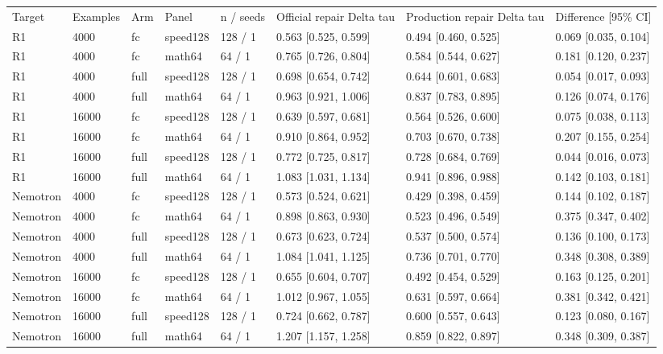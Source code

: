\begin{tabular}{llllllll}
Target & Examples & Arm & Panel & n / seeds & Official repair Delta tau & Production repair Delta tau & Difference [95\% CI] \\
R1 & 4000 & fc & speed128 & 128 / 1 & 0.563 [0.525, 0.599] & 0.494 [0.460, 0.525] & 0.069 [0.035, 0.104] \\
R1 & 4000 & fc & math64 & 64 / 1 & 0.765 [0.726, 0.804] & 0.584 [0.544, 0.627] & 0.181 [0.120, 0.237] \\
R1 & 4000 & full & speed128 & 128 / 1 & 0.698 [0.654, 0.742] & 0.644 [0.601, 0.683] & 0.054 [0.017, 0.093] \\
R1 & 4000 & full & math64 & 64 / 1 & 0.963 [0.921, 1.006] & 0.837 [0.783, 0.895] & 0.126 [0.074, 0.176] \\
R1 & 16000 & fc & speed128 & 128 / 1 & 0.639 [0.597, 0.681] & 0.564 [0.526, 0.600] & 0.075 [0.038, 0.113] \\
R1 & 16000 & fc & math64 & 64 / 1 & 0.910 [0.864, 0.952] & 0.703 [0.670, 0.738] & 0.207 [0.155, 0.254] \\
R1 & 16000 & full & speed128 & 128 / 1 & 0.772 [0.725, 0.817] & 0.728 [0.684, 0.769] & 0.044 [0.016, 0.073] \\
R1 & 16000 & full & math64 & 64 / 1 & 1.083 [1.031, 1.134] & 0.941 [0.896, 0.988] & 0.142 [0.103, 0.181] \\
Nemotron & 4000 & fc & speed128 & 128 / 1 & 0.573 [0.524, 0.621] & 0.429 [0.398, 0.459] & 0.144 [0.102, 0.187] \\
Nemotron & 4000 & fc & math64 & 64 / 1 & 0.898 [0.863, 0.930] & 0.523 [0.496, 0.549] & 0.375 [0.347, 0.402] \\
Nemotron & 4000 & full & speed128 & 128 / 1 & 0.673 [0.623, 0.724] & 0.537 [0.500, 0.574] & 0.136 [0.100, 0.173] \\
Nemotron & 4000 & full & math64 & 64 / 1 & 1.084 [1.041, 1.125] & 0.736 [0.701, 0.770] & 0.348 [0.308, 0.389] \\
Nemotron & 16000 & fc & speed128 & 128 / 1 & 0.655 [0.604, 0.707] & 0.492 [0.454, 0.529] & 0.163 [0.125, 0.201] \\
Nemotron & 16000 & fc & math64 & 64 / 1 & 1.012 [0.967, 1.055] & 0.631 [0.597, 0.664] & 0.381 [0.342, 0.421] \\
Nemotron & 16000 & full & speed128 & 128 / 1 & 0.724 [0.662, 0.787] & 0.600 [0.557, 0.643] & 0.123 [0.080, 0.167] \\
Nemotron & 16000 & full & math64 & 64 / 1 & 1.207 [1.157, 1.258] & 0.859 [0.822, 0.897] & 0.348 [0.309, 0.387] \\
\end{tabular}
